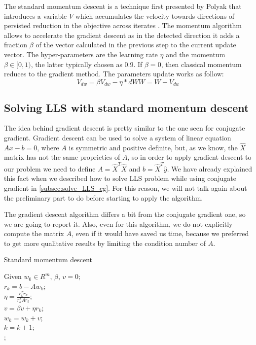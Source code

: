 \noindent The standard momentum descent is a technique first presented by Polyak \cite{POLYAK19641} that introduces a variable $V$ which accumulates the velocity towards directions of persisted reduction in the objective across iterates \cite{pmlr-v28-sutskever13}. The momentum algorithm allows to accelerate the gradient descent as in the detected direction it adds a fraction $\beta$ of the vector calculated in the previous step to the current update vector. The hyper-parameters are the learning rate $\eta$ and the momentum $\beta \in [0,1)$, the latter typically chosen as 0.9. If $\beta = 0$, then classical momentum reduces to the gradient method. The parameters update works as follow: 
\begin{subequations}
    \begin{equation}
        V_{dw} = \beta V_{dw} - \eta*dW
    \end{equation}
    \begin{equation}
        W = W + V_{dw}
    \end{equation}
    \label{eq:momentum_descent}
\end{subequations}

\subsection{Solving LLS with standard momentum descent}
The idea behind gradient descent is pretty similar to the one seen for conjugate gradient. Gradient descent can be used to solve a system of linear equation $Ax - b = 0$, where $A$ is symmetric and positive definite, but, as we know, the $\hat{X}$ matrix has not the same proprieties of $A$, so in order to apply gradient descent to our problem we need to define $A = \hat{X}^T \hat{X}$ and $b = \hat{X}^T \hat{y}$. We have already explained this fact when we described how to solve LLS problem while using conjugate gradient in \ref{subsec:solve_LLS_cg}. For this reason, we will not talk again about the preliminary part to do before starting to apply the algorithm.
\vspace{3mm}

\noindent The gradient descent algorithm differs a bit from the conjugate gradient one, so we are going to report it. Also, even for this algorithm, we do not explicitly compute the matrix $A$, even if it would have saved us time, because we preferred to get more qualitative results by limiting the condition number of $A$.

\begin{algorithm}[H]
    \caption{Standard momentum descent}
    \label{algorithm:smd_lls}
    Given $w_0 \in R^m$, $\beta$, $v = 0$;\\
     {
        $r_k=b-Aw_k$;\\
        $\eta = \frac{r_{k}^{T} r_{k}}{r_{k}^{T} A r_{k}}$;\\
        $v = \beta v + \eta r_k$;\\
        $w_k = w_k + v$;\\
        $k=k+1$;\\
    }
    ;
\end{algorithm}

